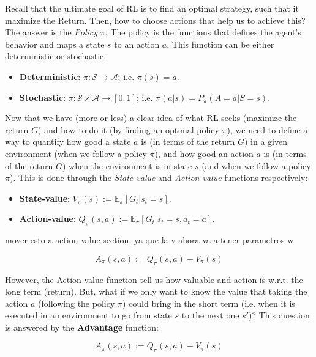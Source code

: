 \documentclass[twoside,twocolumn]{article}
\begin{document}
Recall that the ultimate goal of RL is to find an optimal strategy, such that it maximize the Return. Then, how to choose actions that help us to achieve this? The answer is the \emph{Policy} $\pi$. The policy is the functions that defines the agent’s behavior and maps a state $s$ to an action $a$. This function can be either deterministic or stochastic:

\begin{itemize}
  \item \textbf{Deterministic}: $\pi: \mathcal{S} \rightarrow \mathcal{A}$; i.e. $\pi(s)=a$.
  \item \textbf{Stochastic}: $\pi: \mathcal{S} \times \mathcal{A} \rightarrow [0, 1]$; i.e. $\pi(a|s)=P_{\pi}(A=a|S=s)$.
\end{itemize}

Now that we have (more or less) a clear idea of what RL seeks (maximize the return $G$) and how to do it (by finding an optimal policy $\pi$), we need to define a way to quantify how good a state $a$ is (in terms of the return $G$) in a given environment (when we follow a policy $\pi$), and how good an action $a$ is (in terms of the return $G$) when the environment is in state $s$ (and when we follow a policy $\pi$). This is done through the \emph{State-value} and \emph{Action-value} functions respectively:
\begin{itemize}
    \item \textbf{State-value}: $V_{\pi}(s):= \mathbb{E}_{\pi}[G_t|s_t=s]$.
    \item \textbf{Action-value}: $Q_{\pi}(s, a):= \mathbb{E}_{\pi}[G_t|s_t=s, a_t=a]$.
\end{itemize}


mover esto a action value section, ya que la v ahora va a tener parametros w


\begin{equation}
  A_{\pi}(s,a):=Q_{\pi}(s, a) - V_{\pi}(s)
\end{equation}

\noindent However, the Action-value function tell us how valuable and action is w.r.t. the long term (return). But, what if we only want to know the value that taking the action $a$ (following the policy $\pi$) could bring in the short term (i.e. when it is executed in an environment to go from state $s$ to the next one $s'$)? This question is answered by the \textbf{Advantage} function:

\begin{equation}
  A_{\pi}(s,a):=Q_{\pi}(s, a) - V_{\pi}(s)
\end{equation}
\end{document}
